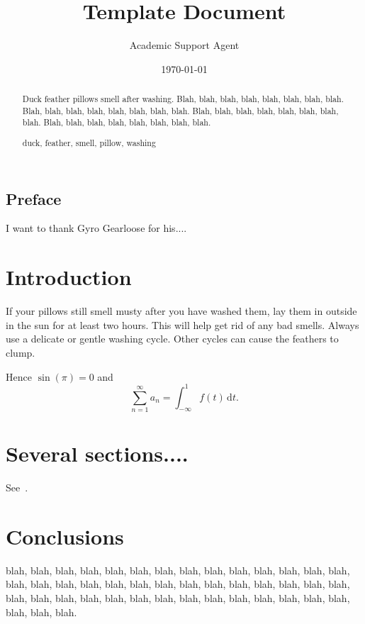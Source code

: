 \documentclass{article}
\title{Template Document}
\author{Academic Support Agent}
\date{\today}
\begin{document}
\maketitle

\makecoverpage   
\subsection*{Preface}
I want to thank Gyro Gearloose for his....
\thispagestyle{empty} 
~\vfill               




\maketitle            
\setcounter{page}{1}  
\begin{abstract}      
  Duck feather pillows smell after washing. 
  Blah, blah, blah, blah, blah, blah, blah, blah. 
  Blah, blah, blah, blah, blah, blah, blah, blah. 
  Blah, blah, blah, blah, blah, blah, blah, blah. 
  Blah, blah, blah, blah, blah, blah, blah, blah. 

  \begin{keywords}    
   duck, feather, smell, pillow, washing
  \end{keywords}
\end{abstract}


\section{Introduction} 
If your pillows still smell musty after you have washed them, lay them
in outside in the sun for at least two hours. This will help get rid
of any bad smells. Always use a delicate or gentle washing
cycle. Other cycles can cause the feathers to clump.  

Hence $\sin(\pi)=0$ and
\[
   \sum_{n=1}^\infty a_n = \int_{-\infty}^1 f(t)\,\mathrm{d}t.
\]

\section{Several sections....}
See~\cite{1915Natur..96..396B,Ben1938}. 

\section{Conclusions}
blah, blah, blah, blah, blah, blah, blah, blah, blah, blah, 
blah, blah, blah, blah, blah, blah, blah, blah, blah, blah, 
blah, blah, blah, blah, blah, blah, blah, blah, blah, blah, 
blah, blah, blah, blah, blah, blah, blah, blah, blah, blah, 
blah, blah, blah, blah, blah.


%
\end{document}
